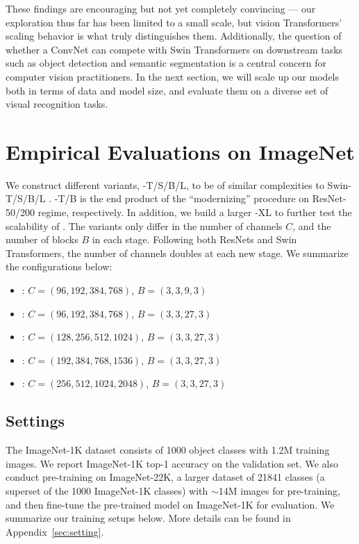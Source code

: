 These findings are encouraging but not yet completely convincing --- our exploration thus far has been limited to a small scale, but vision Transformers' scaling behavior is what truly distinguishes them. Additionally, the question of whether a ConvNet can compete with Swin Transformers on downstream tasks such as object detection and semantic segmentation is a central concern for computer vision practitioners.
In the next section, we will scale up our \cnn{} models both in terms of data and model size, and evaluate them on a diverse set of visual recognition tasks.


\section{Empirical Evaluations on ImageNet}
\label{sec:convnext_config}
 We construct different \cnn{} variants, \cnn{}-T/S/B/L, to be of similar complexities to Swin-T/S/B/L \cite{Liu2021swin}. \cnn{}-T/B is the end product of the ``modernizing'' procedure on ResNet-50/200 regime, respectively. In addition, we build a larger \cnn{}-XL to further test the scalability of \cnn{}. The variants only differ in the number of channels $C$, and the number of blocks $B$ in each stage. Following both ResNets and Swin Transformers, the number of channels doubles at each new stage. We summarize the configurations below:
\begin{itemize}[leftmargin=-.1ex]
\setlength\itemsep{-.2em}
\item[]\cb{}: $C=(96,192,384,768)$, $B=(3,3,9,3)$
\item[]\cb{}: $C=(96,192,384,768)$, $B=(3,3,27,3)$
\item[]\cb{}: $C=(128,256,512,1024)$, $B=(3,3,27,3)$
\item[]\cb{}: $C=(192,384,768,1536)$, $B=(3,3,27,3)$
\item[]\cb{}: $C=(256,512,1024,2048)$, $B=(3,3,27,3)$
\end{itemize}


\subsection{Settings}
The ImageNet-1K dataset consists of 1000 object classes with 1.2M training images. We report ImageNet-1K top-1 accuracy on the validation set. We also conduct pre-training on ImageNet-22K, a larger dataset of 21841 classes (a superset of the 1000 ImageNet-1K classes) with $\sim$14M images for pre-training, and then fine-tune the pre-trained model on ImageNet-1K for evaluation.  We summarize our training setups below. More details can be found in Appendix~\ref{sec:setting}. 

